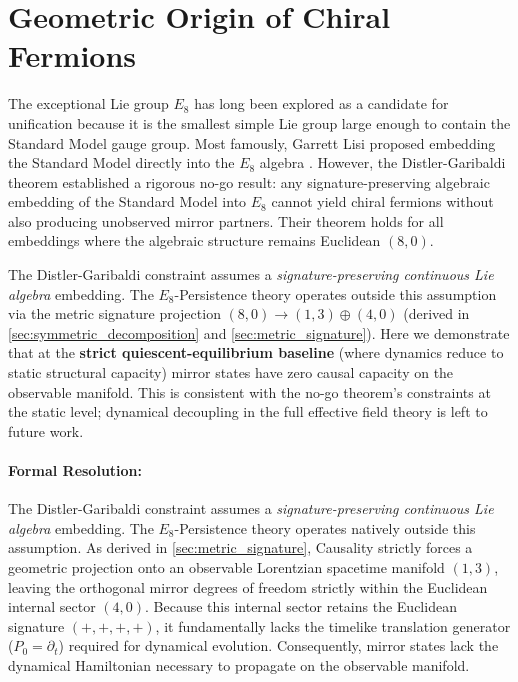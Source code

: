 \section{Geometric Origin of Chiral Fermions}
\label{app:geometric_origin_of_chiral_fermions}

The exceptional Lie group $E_8$ has long been explored as a candidate for unification because it is the smallest simple Lie group large enough to contain the Standard Model gauge group. Most famously, Garrett Lisi proposed embedding the Standard Model directly into the $E_8$ algebra \cite{lisi_exceptionally_2007}. However, the Distler-Garibaldi theorem \cite{distler_there_2010} established a rigorous no-go result: any signature-preserving algebraic embedding of the Standard Model into $E_8$ cannot yield chiral fermions without also producing unobserved mirror partners. Their theorem holds for all embeddings where the algebraic structure remains Euclidean $(8,0)$.

The Distler-Garibaldi constraint assumes a \textit{signature-preserving continuous Lie algebra} embedding. The $E_8$-Persistence theory operates outside this assumption via the metric signature projection $(8,0) \to (1,3) \oplus (4,0)$ (derived in \cref{sec:symmetric_decomposition} and \cref{sec:metric_signature}). Here we demonstrate that at the \textbf{strict quiescent-equilibrium baseline} (where dynamics reduce to static structural capacity) mirror states have zero causal capacity on the observable manifold. This is consistent with the no-go theorem's constraints at the static level; dynamical decoupling in the full effective field theory is left to future work.

\paragraph{Formal Resolution:} The Distler-Garibaldi constraint assumes a \textit{signature-preserving continuous Lie algebra} embedding. The $E_8$-Persistence theory operates natively outside this assumption. As derived in \cref{sec:metric_signature}, Causality strictly forces a geometric projection onto an observable Lorentzian spacetime manifold $(1,3)$, leaving the orthogonal mirror degrees of freedom strictly within the Euclidean internal sector $(4,0)$. Because this internal sector retains the Euclidean signature $(+,+,+,+)$, it fundamentally lacks the timelike translation generator ($P_0 = \partial_t$) required for dynamical evolution. Consequently, mirror states lack the dynamical Hamiltonian necessary to propagate on the observable manifold.

